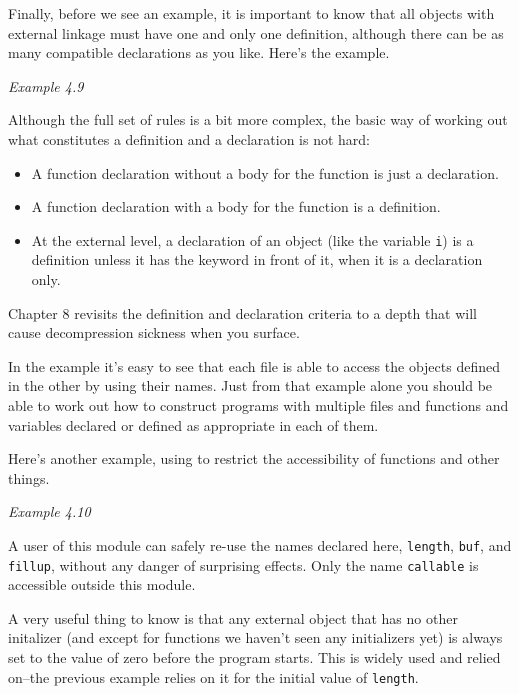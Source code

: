   Finally, before we see an example, it is important to know that all
   objects with external linkage must have one and only one definition,
   although there can be as many compatible declarations as you like. Here's
   the example.

   \begin{center}\textit{Example 4.9}\end{center}

  Although the full set of rules is a bit more complex, the basic way of
   working out what constitutes a definition and a declaration is not
   hard:

  \begin{itemize}
   \item A function declaration without a body for the function is just a
    declaration.
   \item A function declaration with a body for the function is a
    definition.
   \item At the external level, a declaration of an object (like the
    variable \texttt{i}) is a definition unless it has the keyword
    \extern{} in front of it, when it is a declaration only.
  \end{itemize}
  Chapter 8 revisits the definition and declaration criteria
   to a depth that will cause decompression sickness when you surface.


  In the example it's easy to see that each file is able to access the
   objects defined in the other by using their names. Just from that example
   alone you should be able to work out how to construct programs with
   multiple files and functions and variables declared or defined as
   appropriate in each of them.


  Here's another example, using \static{} to restrict the
   accessibility of functions and other things.

   \begin{center}\textit{Example 4.10}\end{center}

  A user of this module can safely re-use the names declared here,
   \texttt{length}, \texttt{buf}, and \texttt{fillup}, without
   any danger of surprising effects. Only the name \texttt{callable} is
   accessible outside this module.


  A very useful thing to know is that any external object that has no
   other initalizer (and except for functions we haven't seen any
   initializers yet) is always set to the value of zero before the program
   starts. This is widely used and relied on--the previous example
   relies on it for the initial value of \texttt{length}.



